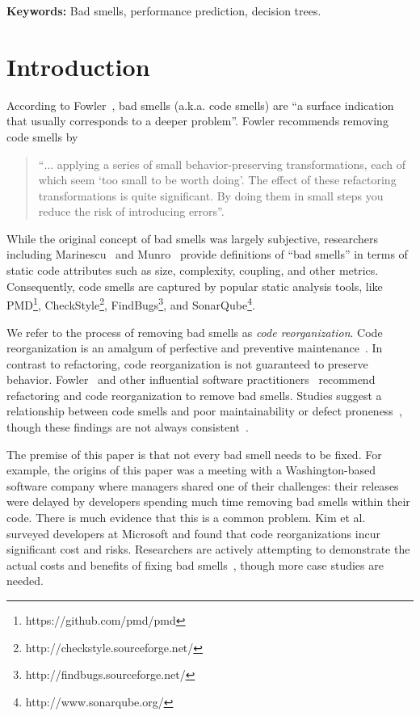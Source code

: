 \documentclass[twocolumn,5p]{elsarticle}
\theoremstyle{break}
\begin{document}
	
	\vspace{1mm}
	\noindent
	{\bf Keywords:} Bad smells,
	performance prediction,  decision trees.
	
	
	
	
	\section{Introduction}
	\label{sect:intro}
	According to   Fowler~\cite{fowler99}, bad smells (a.k.a. code smells)
	are ``a surface indication that usually corresponds to a deeper problem''.
	Fowler  recommends   removing   code smells   by
	\begin{quote}
		``$\ldots$ applying a series of small behavior-preserving 
		transformations, 
		each
		of which seem `too small to be worth doing'.
		The  effect of   these refactoring transformations is quite 
		significant. By doing them in small steps you reduce the risk
		of introducing errors''.
	\end{quote}
	

	While the original concept of bad smells was largely subjective, 
	researchers including Marinescu~\cite{Lanza2006} and 
	Munro~\cite{munro2005product} provide definitions of ``bad smells'' in 
	terms of static code attributes such as size, complexity, coupling, and 
	other metrics. Consequently, code smells are captured by popular static 
	analysis tools, like PMD\footnote{https://github.com/pmd/pmd}, 
	CheckStyle\footnote{http://checkstyle.sourceforge.net/}, 
	FindBugs\footnote{http://findbugs.sourceforge.net/}, and 
	SonarQube\footnote{http://www.sonarqube.org/}.

        We refer to the process of removing bad smells as \textit{code 
	reorganization}. Code reorganization is an amalgum of perfective and 
	preventive maintenance~\cite{iso14764}. In contrast to refactoring, code 
	reorganization is not guaranteed to preserve behavior.
	Fowler~\cite{fowler99} and other influential software 
	practitioners~\cite{mcconnell2004code,horror} recommend refactoring and 
	code reorganization to remove bad smells. Studies suggest a relationship 
	between code smells and poor maintainability or defect 
	proneness~\cite{yamashita2013code,yama13,zazworka2011investigating}, though 
	these findings are not always consistent~\cite{olbrich2010all}.
	
	The premise of this paper is that not every bad smell needs to be fixed.
        For example, 
	the origins of this paper was a meeting with a  Washington-based software company where managers
        shared one of 
	their challenges: their  releases were delayed by 
	developers spending  much time removing bad smells within their code. There is much evidence
        that this is a common problem. Kim 
	et al.~\cite{kim2012field} surveyed developers at Microsoft and found that 
	code reorganizations incur significant cost and risks. Researchers are 
	actively attempting to demonstrate the actual costs and benefits of fixing 
	bad 
	smells~\cite{nugroho2011empirical,zazworka2011prioritizing,zazworka2013case},
	 though more case studies are needed.
	
\end{document}
